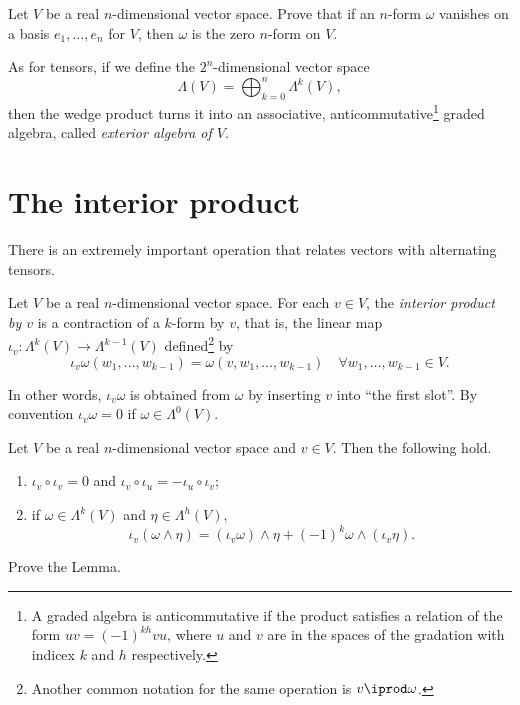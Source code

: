 \begin{exercise}\label{ex:zeroform}
  Let $V$ be a real $n$-dimensional vector space.
  Prove that if an $n$-form $\omega$ vanishes on a basis $e_1,\ldots,e_n$ for $V$, then $\omega$ is the zero $n$-form on $V$.
\end{exercise}

\begin{remark}
  As for tensors, if we define the $2^n$-dimensional vector space
  \begin{equation}
    \Lambda(V) = \bigoplus_{k=0}^n \Lambda^k(V),
  \end{equation}
  then the wedge product turns it into an associative, anticommutative\footnote{A graded algebra is anticommutative if the product satisfies a relation of the form $uv = {(-1)}^{kh}vu$, where $u$ and $v$ are in the spaces of the gradation with indicex $k$ and $h$ respectively.} graded algebra, called \emph{exterior algebra of $V$}.
\end{remark}

\section{The interior product}

There is an extremely important operation that relates vectors with alternating tensors.

\begin{definition}
  Let $V$ be a real $n$-dimensional vector space.
  For each $v\in V$, the \emph{interior product by $v$} is a contraction of a $k$-form by $v$, that is, the linear map $\iota_v:\Lambda^{k}(V)\to \Lambda^{k-1}(V)$ defined\footnote{Another common notation for the same operation is $v \iprod \omega$.} by
  \begin{equation}
    \iota_v\omega(w_1,\ldots,w_{k-1}) = \omega(v,w_1,\ldots,w_{k-1})
    \quad \forall w_1,\ldots,w_{k-1} \in V.
  \end{equation}
\end{definition}

In other words, $\iota_v\omega$ is obtained from $\omega$ by inserting $v$ into ``the first slot''.
By convention $\iota_v\omega = 0$ if $\omega\in\Lambda^0(V)$.

\begin{lemma}\label{lemma:intprod}
  Let $V$ be a real $n$-dimensional vector space and $v\in V$.
  Then the following hold.
  \begin{enumerate}
    \item $\iota_v\circ \iota_v = 0$ and $\iota_v\circ\iota_u = -\iota_u\circ\iota_v$;
    \item if $\omega\in\Lambda^k(V)$ and $\eta\in\Lambda^h(V)$,
          \begin{equation}
            \iota_v(\omega\wedge\eta) = (\iota_v\omega)\wedge\eta + {(-1)}^k\omega\wedge(\iota_v\eta).
          \end{equation}
  \end{enumerate}
\end{lemma}
\begin{exercise}
  Prove the Lemma.
\end{exercise}

